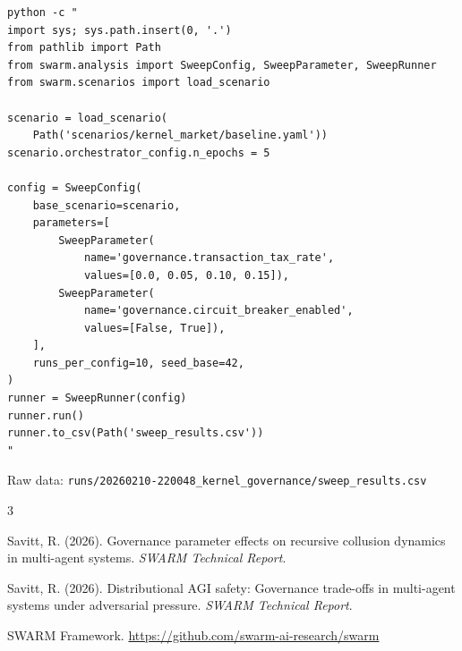 \documentclass[11pt]{article}
\begin{document}
\begin{verbatim}
python -c "
import sys; sys.path.insert(0, '.')
from pathlib import Path
from swarm.analysis import SweepConfig, SweepParameter, SweepRunner
from swarm.scenarios import load_scenario

scenario = load_scenario(
    Path('scenarios/kernel_market/baseline.yaml'))
scenario.orchestrator_config.n_epochs = 5

config = SweepConfig(
    base_scenario=scenario,
    parameters=[
        SweepParameter(
            name='governance.transaction_tax_rate',
            values=[0.0, 0.05, 0.10, 0.15]),
        SweepParameter(
            name='governance.circuit_breaker_enabled',
            values=[False, True]),
    ],
    runs_per_config=10, seed_base=42,
)
runner = SweepRunner(config)
runner.run()
runner.to_csv(Path('sweep_results.csv'))
"
\end{verbatim}

Raw data: \texttt{runs/20260210-220048\_kernel\_governance/sweep\_results.csv}

\begin{thebibliography}{3}

Savitt, R. (2026).
Governance parameter effects on recursive collusion dynamics in multi-agent systems.
\emph{SWARM Technical Report}.

Savitt, R. (2026).
Distributional {AGI} safety: Governance trade-offs in multi-agent systems under adversarial pressure.
\emph{SWARM Technical Report}.

SWARM Framework. \url{https://github.com/swarm-ai-research/swarm}

\end{thebibliography}
\end{document}
